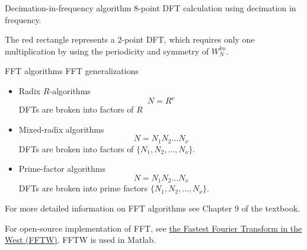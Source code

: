 \documentclass[10pt]{beamer}
\begin{document}
% 
\begin{frame}{Decimation-in-frequency algorithm}
8-point DFT calculation using decimation in frequency.

The red rectangle represents a 2-point DFT, which requires only one multiplication by using the periodicity and symmetry of $W_N^{kn}$. 
\begin{center}
\end{center}
\end{frame}

% 
\begin{frame}{FFT algorithms}
	FFT generalizations
	\begin{itemize}
		\item Radix $R$-algorithms
		\begin{equation*}
			N = R^\nu
		\end{equation*}
		DFTs are broken into factors of $R$
		
		\item Mixed-radix algorithms
		\begin{equation*}
			N = N_1N_2\ldots N_\nu
		\end{equation*}
		DFTs are broken into factors of $\{N_1, N_2, \ldots, N_\nu\}$.
		
		\item Prime-factor algorithms
		\begin{equation*}
			N = N_1N_2\ldots N_\nu
		\end{equation*}
		DFTs are broken into prime factors $\{N_1, N_2, \ldots, N_\nu\}$.
\end{itemize}
\vspace{0.25cm}
For more detailed information on FFT algorithms see Chapter 9 of the textbook.

\vspace{0.25cm}
For open-source implementation of FFT, see \href{http://www.fftw.org/}{the Fastest Fourier Transform in the West (FFTW)}. FFTW is used in Matlab.
\end{frame}
\end{document}
